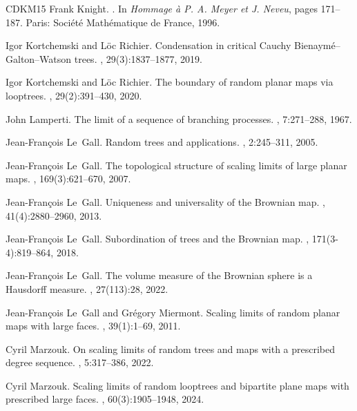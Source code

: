 \documentclass[british, a4paper,11pt]{article}
\numberwithin{equation}{section}
\theoremstyle{definition}
\renewcommand{\i}{\operatorname{i}}
\begin{document}
{\begin{thebibliography}{CDKM15}
Frank Knight.
.
\newblock In {\em {Hommage \`a P. A. Meyer et J. Neveu}}, pages 171--187.
  Paris: Soci\'et\'e Math\'ematique de France, 1996.

Igor Kortchemski and Lo{\"\i}c Richier.
\newblock Condensation in critical {C}auchy {Bienaym{\'e}--Galton--Watson}
  trees.
, 29(3):1837--1877, 2019.

Igor Kortchemski and Lo{\"\i}c Richier.
\newblock The boundary of random planar maps via looptrees.
, 29(2):391--430, 2020.

John Lamperti.
\newblock The limit of a sequence of branching processes.
, 7:271--288, 1967.

Jean-Fran{\c{c}}ois Le~Gall.
\newblock Random trees and applications.
, 2:245--311, 2005.

Jean-Fran\c{c}ois Le~Gall.
\newblock The topological structure of scaling limits of large planar maps.
, 169(3):621--670, 2007.

Jean-Fran{\c c}ois Le~Gall.
\newblock Uniqueness and universality of the {B}rownian map.
, 41(4):2880--2960, 2013.

Jean-Fran{\c{c}}ois Le~Gall.
\newblock Subordination of trees and the {Brownian} map.
, 171(3-4):819--864, 2018.

Jean-Fran{\c{c}}ois Le~Gall.
\newblock The volume measure of the {Brownian} sphere is a {Hausdorff} measure.
, 27(113):28, 2022.

Jean-Fran{\c c}ois Le~Gall and Gr{\'e}gory Miermont.
\newblock Scaling limits of random planar maps with large faces.
, 39(1):1--69, 2011.

Cyril Marzouk.
\newblock On scaling limits of random trees and maps with a prescribed degree
  sequence.
, 5:317--386, 2022.

Cyril Marzouk.
\newblock Scaling limits of random looptrees and bipartite plane maps with
  prescribed large faces.
, 60(3):1905--1948,
  2024.


\end{thebibliography}}
\end{document}
